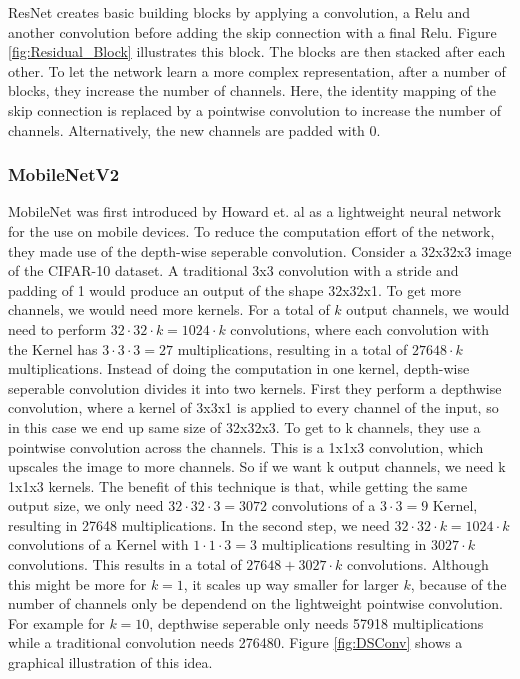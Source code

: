 ResNet creates basic building blocks by applying a convolution, a Relu and
another convolution before adding the skip connection with a final Relu. Figure
\ref{fig:Residual_Block} illustrates this block. The blocks are then stacked
after each other. To let the network learn a more complex representation, after
a number of blocks, they increase the number of channels. Here, the identity
mapping of the skip connection is replaced by a pointwise convolution to
increase the number of channels. Alternatively, the new channels are padded with
0.



\subsubsection{MobileNetV2}\label{sub:MobileNetV2}
MobileNet was first introduced by Howard et. al \cite{howard2017mobilenets} as a
lightweight neural network for the use on mobile devices. To reduce the
computation effort of the network, they made use of the depth-wise seperable
convolution. Consider a 32x32x3 image of the CIFAR-10 dataset. A traditional 3x3
convolution with a stride and padding of 1 would produce an output of the shape
32x32x1. To get more channels, we would need more kernels. For a total of $k$
output channels, we would need to perform $32\cdot 32 \cdot k=1024\cdot k$
convolutions, where each convolution with the Kernel has $3\cdot 3 \cdot 3=27$
multiplications, resulting in a total of $27648\cdot k$ multiplications.
Instead of doing the computation in one kernel, depth-wise seperable convolution
divides it into two kernels. First they perform a depthwise convolution, where a
kernel of 3x3x1 is applied to every channel of the input, so in this case we end
up same size of 32x32x3. To get to k channels, they use a pointwise convolution
across the channels. This is a 1x1x3 convolution, which upscales the image to
more channels. So if we want k output channels, we need k 1x1x3 kernels. The
benefit of this technique is that, while getting the same output size, we only
need $32\cdot 32 \cdot 3=3072$ convolutions of a $3\cdot 3=9$ Kernel, resulting
in 27648 multiplications. In the second step, we need $32\cdot 32\cdot
k=1024\cdot k$ convolutions of a Kernel with $1\cdot 1\cdot 3=3$ multiplications
resulting in $3027\cdot k$ convolutions. This results in a total of $27648 +
3027\cdot k$ convolutions. Although this might be more for $k=1$, it scales up
way smaller for larger $k$, because of the number of channels only be dependend
on the lightweight pointwise convolution. For example for $k=10$, depthwise
seperable only needs 57918 multiplications while a traditional convolution needs
276480. Figure \ref{fig:DSConv} shows a graphical illustration of this idea.

